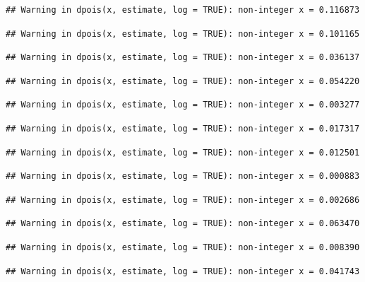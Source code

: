 \documentclass[]{article}
\begin{document}
\begin{verbatim}
## Warning in dpois(x, estimate, log = TRUE): non-integer x = 0.116873
\end{verbatim}

\begin{verbatim}
## Warning in dpois(x, estimate, log = TRUE): non-integer x = 0.101165
\end{verbatim}

\begin{verbatim}
## Warning in dpois(x, estimate, log = TRUE): non-integer x = 0.036137
\end{verbatim}

\begin{verbatim}
## Warning in dpois(x, estimate, log = TRUE): non-integer x = 0.054220
\end{verbatim}

\begin{verbatim}
## Warning in dpois(x, estimate, log = TRUE): non-integer x = 0.003277
\end{verbatim}

\begin{verbatim}
## Warning in dpois(x, estimate, log = TRUE): non-integer x = 0.017317
\end{verbatim}

\begin{verbatim}
## Warning in dpois(x, estimate, log = TRUE): non-integer x = 0.012501
\end{verbatim}

\begin{verbatim}
## Warning in dpois(x, estimate, log = TRUE): non-integer x = 0.000883
\end{verbatim}

\begin{verbatim}
## Warning in dpois(x, estimate, log = TRUE): non-integer x = 0.002686
\end{verbatim}

\begin{verbatim}
## Warning in dpois(x, estimate, log = TRUE): non-integer x = 0.063470
\end{verbatim}

\begin{verbatim}
## Warning in dpois(x, estimate, log = TRUE): non-integer x = 0.008390
\end{verbatim}

\begin{verbatim}
## Warning in dpois(x, estimate, log = TRUE): non-integer x = 0.041743
\end{verbatim}
\end{document}
